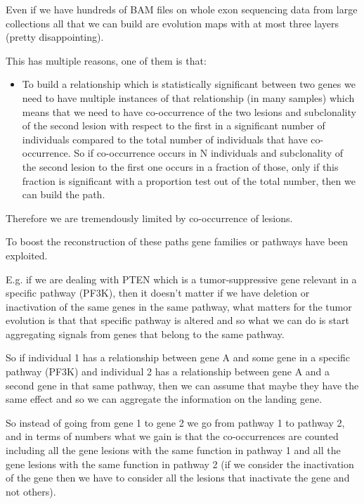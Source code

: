 Even if we have hundreds of BAM files on whole exon sequencing data from large
collections all that we can build are evolution maps with at most three layers
(pretty disappointing).

This has multiple reasons, one of them is that:

\begin{itemize}
\item
  To build a relationship which is statistically significant between two genes
  we need to have multiple instances of that relationship (in many samples)
  which means that we need to have co-occurrence of the two lesions and
  subclonality of the second lesion with respect to the first in a significant
  number of individuals compared to the total number of individuals that have
  co-occurrence. So if co-occurrence occurs in N individuals and subclonality of
  the second lesion to the first one occurs in a fraction of those, only if this
  fraction is significant with a proportion test out of the total number, then
  we can build the path.
\end{itemize}

Therefore we are tremendously limited by co-occurrence of lesions.

To boost the reconstruction of these paths gene families or pathways have been
exploited.

E.g. if we are dealing with PTEN which is a tumor-suppressive gene relevant in a
specific pathway (PF3K), then it doesn't matter if we have deletion or
inactivation of the same genes in the same pathway, what matters for the tumor
evolution is that that specific pathway is altered and so what we can do is
start aggregating signals from genes that belong to the same pathway.

So if individual 1 has a relationship between gene A and some gene in a specific
pathway (PF3K) and individual 2 has a relationship between gene A and a second
gene in that same pathway, then we can assume that maybe they have the same
effect and so we can aggregate the information on the landing gene.

So instead of going from gene 1 to gene 2 we go from pathway 1 to pathway 2, and
in terms of numbers what we gain is that the co-occurrences are counted
including all the gene lesions with the same function in pathway 1 and all the
gene lesions with the same function in pathway 2 (if we consider the
inactivation of the gene then we have to consider all the lesions that
inactivate the gene and not others).

